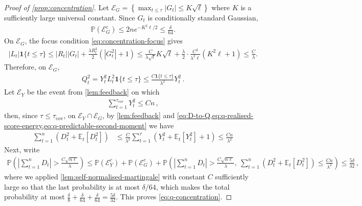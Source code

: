 \documentclass[11pt]{article}
\newcommand{\E}{\mathbb E}
\newcommand{\Pp}{\mathbb P}
\newcommand{\1}{\mathbf 1}
\begin{document}
\begin{proof}[Proof of \cref{prop:concentration}]
    Let
    $\mathcal E_G
        =\left\{
        \max_{t\leq\tau}|G_t|\leq K\sqrt\ell
        \right\}$
    where $K$ is a sufficiently large universal constant.
    Since $G_t$ is conditionally standard Gaussian,
    \begin{align}
        \Pp(\mathcal E_G^c)
        \leq2ne^{-K^2\ell/2}
        \leq\frac{\delta}{64}.
        \label{eq:q-gaussian-maximum}
    \end{align}
    On $\mathcal E_G$, the focus condition \eqref{eq:concentration-focus} gives
    \begin{align}
        |L_t| \1\{t\leq \tau\} \leq |R_t||G_t| + \frac{\lambda R_t^2}{2}(|G_t^2| + 1)
        \leq
        \frac{C}{\lambda\sqrt\ell}K\sqrt\ell + \frac{\lambda}{2} \cdot \frac{C^2}{\lambda^2\ell}(K^2\ell + 1)
        \leq \frac{C}{\lambda}.
        \label{eq:q-score-bound}
    \end{align}
    Therefore, on $\mathcal E_G$,
    \begin{align}
        Q_t^2
        =
        Y_t^2L_t^2\1\{t\leq\tau\}
        \leq
        \frac{C\1\{t\leq\tau\}}{\lambda^2}
        Y_t^2\,.
        \label{eq:q-realised-score-energy}
    \end{align}
    Let $\mathcal E_Y$ be the event from \cref{lem:feedback} on which
    \begin{align}
        \sum_{t=1}^{\tau_{\mathrm{cov}}}Y_t^2\leq Cn\,,
    \end{align}
    then, since $\tau\leq\tau_{\mathrm{cov}}$, on
    $\mathcal E_Y\cap\mathcal E_G$,
    by \cref{lem:feedback} and \cref{eq:D-to-Q,eq:q-realised-score-energy,eq:q-predictable-second-moment} we have
    \begin{align}
        \sum_{t=1}^n
        \left(D_t^2+\E_t[D_t^2]\right)
         & \leq
        \frac{C}{\lambda^2}
        \sum_{t=1}^\tau
        \left(
        Y_t^2
        + \E_t[Y_t^2]
        +1
        \right)
        \leq\frac{Cn}{\lambda^2}
        \label{eq:q-total-self-normaliser}
    \end{align}
    Next, write
    \begin{align}
        \Pp\left(
        \left|\sum_{t=1}^nD_t\right|>
        \frac{C\sqrt{n\ell}}{\lambda}
        \right)
        \leq
        \Pp(\mathcal E_Y^c)
        +\Pp(\mathcal E_G^c)
        +
        \Pp\left(
        \left|\sum_{t=1}^nD_t\right|>
        \frac{C\sqrt{n\ell}}{\lambda},
        \ \sum_{t=1}^n(D_t^2+\E_t[D_t^2])
        \leq\frac{Cn}{\lambda^2}
        \right)
        \leq
        \frac{5\delta}{32}\,,
    \end{align}
    where we applied \cref{lem:self-normalised-martingale} with constant $C$ sufficiently large
    so that the last probability is at most $\delta/64$, which makes the total probability at most $\frac{\delta}{8} + \frac{\delta}{64} + \frac{\delta}{64} = \frac{5\delta}{32}$.
    This proves
    \eqref{eq:q-concentration}.


\end{proof}
\end{document}
